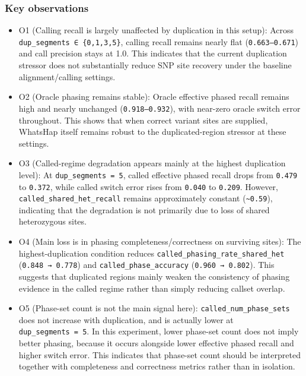 \documentclass[
]{article}
\begin{document}
\subsubsection{Key observations}\label{key-observations-1}

\begin{itemize}
\item
  O1 (Calling recall is largely unaffected by duplication in this
  setup): Across \texttt{dup\_segments\ ∈\ \{0,1,3,5\}}, calling recall
  remains nearly flat (\texttt{0.663–0.671}) and call precision stays at
  1.0. This indicates that the current duplication stressor does not
  substantially reduce SNP site recovery under the baseline
  alignment/calling settings.
\item
  O2 (Oracle phasing remains stable): Oracle effective phased recall
  remains high and nearly unchanged (\texttt{0.918–0.932}), with
  near-zero oracle switch error throughout. This shows that when correct
  variant sites are supplied, WhatsHap itself remains robust to the
  duplicated-region stressor at these settings.
\item
  O3 (Called-regime degradation appears mainly at the highest
  duplication level): At \texttt{dup\_segments\ =\ 5}, called effective
  phased recall drops from \texttt{0.479} to \texttt{0.372}, while
  called switch error rises from \texttt{0.040} to \texttt{0.209}.
  However, \texttt{called\_shared\_het\_recall} remains approximately
  constant (\texttt{\textasciitilde{}0.59}), indicating that the
  degradation is not primarily due to loss of shared heterozygous sites.
\item
  O4 (Main loss is in phasing completeness/correctness on surviving
  sites): The highest-duplication condition reduces
  \texttt{called\_phasing\_rate\_shared\_het} (\texttt{0.848\ →\ 0.778})
  and \texttt{called\_phase\_accuracy} (\texttt{0.960\ →\ 0.802}). This
  suggests that duplicated regions mainly weaken the consistency of
  phasing evidence in the called regime rather than simply reducing
  callset overlap.
\item
  O5 (Phase-set count is not the main signal here):
  \texttt{called\_num\_phase\_sets} does not increase with duplication,
  and is actually lower at \texttt{dup\_segments\ =\ 5}. In this
  experiment, lower phase-set count does not imply better phasing,
  because it occurs alongside lower effective phased recall and higher
  switch error. This indicates that phase-set count should be
  interpreted together with completeness and correctness metrics rather
  than in isolation.
\end{itemize}
\end{document}
